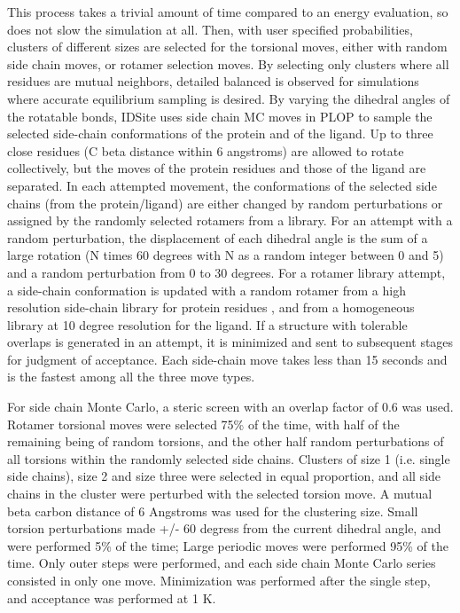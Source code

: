 This process takes a trivial amount of time compared to an energy evaluation, so does not slow the simulation at all.
Then, with user specified probabilities, clusters of different sizes are selected for the torsional moves, either with random side chain moves, or rotamer selection moves.
By selecting only clusters where all residues are mutual neighbors, detailed balanced is observed for simulations where accurate equilibrium sampling is desired.
By varying the dihedral angles of the rotatable bonds, IDSite uses side chain MC moves in PLOP to sample the selected side-chain conformations of the protein and of the ligand.
Up to three close residues (C beta distance within 6 angstroms) are allowed to rotate collectively, but the moves of the protein residues and those of the ligand are separated.
In each attempted movement, the conformations of the selected side chains (from the protein/ligand) are either changed by random perturbations or assigned by the randomly selected rotamers from a library.
For an attempt with a random perturbation, the displacement of each dihedral angle is the sum of a large rotation (N times 60 degrees with N as a random integer between 0 and 5) and a random perturbation from 0 to 30 degrees.
For a rotamer library attempt, a side-chain conformation is updated with a random rotamer from a high resolution side-chain library for protein residues \cite{xiang2001extending}, and from a homogeneous library at 10 degree resolution for the ligand.
If a structure with tolerable overlaps is generated in an attempt, it is minimized and sent to subsequent stages for judgment of acceptance.
Each side-chain move takes less than 15 seconds and is the fastest among all the three move types.

For side chain Monte Carlo, a steric screen with an overlap factor of 0.6 was used.
Rotamer torsional moves were selected 75\% of the time, with half of the remaining being of random torsions, and the other half random perturbations of all torsions within the randomly selected side chains.
Clusters of size 1 (i.e. single side chains), size 2 and size three were selected in equal proportion, and all side chains in the cluster were perturbed with the selected torsion move.
A mutual beta carbon distance of 6 Angstroms was used for the clustering size.
Small torsion perturbations made +/- 60 degress from the current dihedral angle, and were performed 5\% of the time; Large periodic moves were performed 95\% of the time.
Only outer steps were performed, and each side chain Monte Carlo series consisted in only one move.
Minimization was performed after the single step, and acceptance was performed at 1 K.

